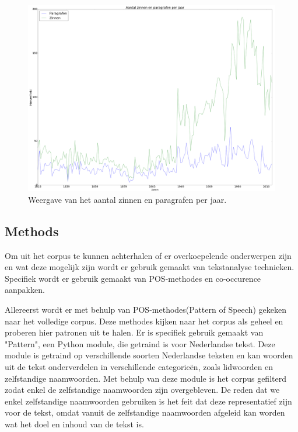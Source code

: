 \begin{figure}[H]
\begin{center}
\includegraphics[width=1.2\textwidth]{fig/Inhoudverdeling}
\caption{\label{inhoud} Weergave van het aantal zinnen en paragrafen per jaar.}
\end{center}
\end{figure}



\pagebreak
\subsection{Methods}
Om uit het corpus te kunnen achterhalen of er overkoepelende onderwerpen zijn en wat deze mogelijk zijn wordt er gebruik gemaakt van tekstanalyse technieken. Specifiek wordt er gebruik gemaakt van POS-methodes en co-occurence aanpakken.~\cite{callon1991co}  

Allereerst wordt er met behulp van POS-methodes(Pattern of Speech) gekeken naar het volledige corpus. Deze methodes kijken naar het corpus als geheel en proberen hier patronen uit te halen. Er is specifiek gebruik gemaakt van "Pattern", een Python module, die getraind is voor Nederlandse tekst. Deze module is getraind op verschillende soorten Nederlandse teksten en kan woorden uit de tekst onderverdelen in verschillende categorieën, zoals lidwoorden en zelfstandige naamwoorden. Met behulp van deze module is het corpus gefilterd zodat enkel de zelfstandige naamwoorden zijn overgebleven. De reden dat we enkel zelfstandige naamwoorden gebruiken is het feit dat deze representatief zijn voor de tekst, omdat vanuit de zelfstandige naamwoorden afgeleid kan worden wat het doel en inhoud van de tekst is.


